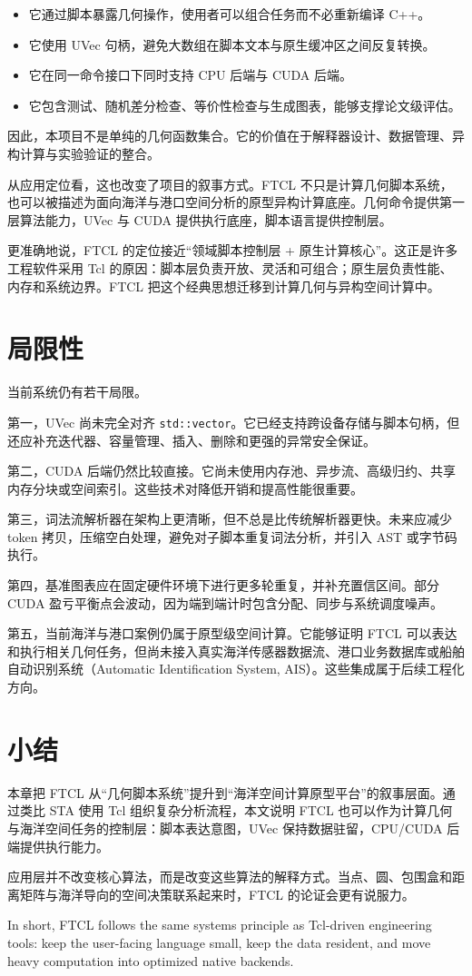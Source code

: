 \begin{itemize}
  \item 它通过脚本暴露几何操作，使用者可以组合任务而不必重新编译 C++。
  \item 它使用 UVec 句柄，避免大数组在脚本文本与原生缓冲区之间反复转换。
  \item 它在同一命令接口下同时支持 CPU 后端与 CUDA 后端。
  \item 它包含测试、随机差分检查、等价性检查与生成图表，能够支撑论文级评估。
\end{itemize}

因此，本项目不是单纯的几何函数集合。它的价值在于解释器设计、数据管理、异构计算与实验验证的整合。

从应用定位看，这也改变了项目的叙事方式。FTCL 不只是计算几何脚本系统，也可以被描述为面向海洋与港口空间分析的原型异构计算底座。几何命令提供第一层算法能力，UVec 与 CUDA 提供执行底座，脚本语言提供控制层。

更准确地说，FTCL 的定位接近“领域脚本控制层 + 原生计算核心”。这正是许多工程软件采用 Tcl 的原因：脚本层负责开放、灵活和可组合；原生层负责性能、内存和系统边界。FTCL 把这个经典思想迁移到计算几何与异构空间计算中。

\section{局限性}
当前系统仍有若干局限。

第一，UVec 尚未完全对齐 \texttt{std::vector}。它已经支持跨设备存储与脚本句柄，但还应补充迭代器、容量管理、插入、删除和更强的异常安全保证。

第二，CUDA 后端仍然比较直接。它尚未使用内存池、异步流、高级归约、共享内存分块或空间索引。这些技术对降低开销和提高性能很重要。

第三，词法流解析器在架构上更清晰，但不总是比传统解析器更快。未来应减少 token 拷贝，压缩空白处理，避免对子脚本重复词法分析，并引入 AST 或字节码执行。

第四，基准图表应在固定硬件环境下进行更多轮重复，并补充置信区间。部分 CUDA 盈亏平衡点会波动，因为端到端计时包含分配、同步与系统调度噪声。

第五，当前海洋与港口案例仍属于原型级空间计算。它能够证明 FTCL 可以表达和执行相关几何任务，但尚未接入真实海洋传感器数据流、港口业务数据库或船舶自动识别系统（Automatic Identification System, AIS）。这些集成属于后续工程化方向。

\section{小结}
本章把 FTCL 从“几何脚本系统”提升到“海洋空间计算原型平台”的叙事层面。通过类比 STA 使用 Tcl 组织复杂分析流程，本文说明 FTCL 也可以作为计算几何与海洋空间任务的控制层：脚本表达意图，UVec 保持数据驻留，CPU/CUDA 后端提供执行能力。

应用层并不改变核心算法，而是改变这些算法的解释方式。当点、圆、包围盒和距离矩阵与海洋导向的空间决策联系起来时，FTCL 的论证会更有说服力。

In short, FTCL follows the same systems principle as Tcl-driven engineering tools: keep the user-facing language small, keep the data resident, and move heavy computation into optimized native backends.

